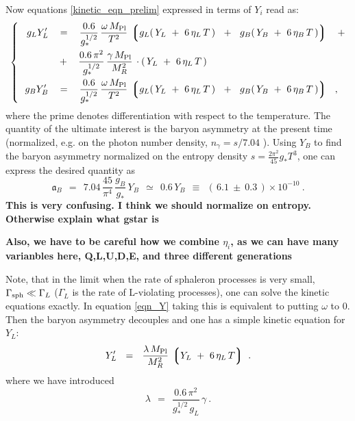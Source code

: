 \documentclass[12pt]{revtex4}
\newcommand{\lgr}{\left\lgroup}
\newcommand{\rgr}{\right\rgroup}
\newcommand{\Mpl}{M_{\rm Pl}}
\newcommand{\Gsph}{\Gamma_{\rm sph}}
\begin{document}
	Now equations \eqref{kinetic_eqn_prelim} expressed in terms of
	$ Y_i $ read as:
\begin{equation}
\label{eqn_Y}
\left\{~~
\begin{split}
	g_L Y_L' 
	& ~~\;=~~\;
	\frac{0.6}{g_*^{1/2}}\, 
	\frac{\omega\,\Mpl}{T^2}\,
	\lgr g_L (\,Y_L~+~6\,\eta_L\,T\,) ~~+~~ 
	     g_B (\,Y_B~+~6\,\eta_B\,T\,)  \rgr 
	\;~~+
	\\
	& \;~~+~~\;  
	\frac{0.6\,\pi^2}{g_*^{1/2}}\, 
	\frac{\gamma\,\Mpl}{M_R^2}\,
	\cdot (\, Y_L ~+~ 6\,\eta_L\,T\,)\\
	g_B Y_B' 
	& ~~\;=~~\;
	\frac{0.6}{g_*^{1/2}}\, 
	\frac{\omega\,\Mpl}{T^2}\,
	\lgr g_L (\,Y_L~+~6\,\eta_L\,T\,) ~~+~~ 
	     g_B (\,Y_B~+~6\,\eta_B\,T\,)  \rgr 
	~~,
\end{split}
\right.
\end{equation}
	where the prime denotes differentiation with respect to
	the temperature.
	The quantity of the ultimate interest is the baryon asymmetry 
	at the present time (normalized, e.g. on the photon number density,
	$ n_\gamma = s / 7.04 $ \cite{Kolb:1990vq}). 
	Using $ Y_B $ to find the baryon asymmetry normalized on the entropy
	density $ s = \frac{2\pi^2}{45} g_* T^3 $, one can express the desired
	quantity as
\begin{equation}
\label{def_asy}
	\mathfrak{a}_B ~~=~~ 7.04\, \frac{45}{\pi^4}\, \frac{g_B}{g_*}\, Y_B
	~~\simeq~~ 0.6 \, Y_B 
		~~\equiv~~ (\, 6.1 ~\pm~ 0.3 \,)\times 10^{-10}~.
\end{equation}
{\bf This is very confusing. I think we should normalize on entropy.
Otherwise explain what gstar is}

{\bf Also, we have to be careful how we combine $\eta_i$, as we can have many varianbles here, 
Q,L,U,D,E, and three different generations} 

	Note, that in the limit when the rate of sphaleron processes
	is very small, $ \Gsph \ll \Gamma_L $ ($ \Gamma_L $ is the rate
	of L-violating processes), one can solve the kinetic equations
	exactly. 
	In equation \eqref{eqn_Y} taking this is equivalent to 
	putting $ \omega $ to $ 0 $.
	Then the baryon asymmetry decouples and one has a simple 
	kinetic equation for $ Y_L $:
\begin{equation}
\label{btz_simple}
	Y_L' ~~=~~ \frac{\lambda\,\Mpl}{M_R^2} \,
			\lgr Y_L ~+~ 6\,\eta_L\, T \rgr~.
\end{equation}
	where we have introduced
\[
	\lambda ~~=~~ \frac{0.6\, \pi^2}
    		         {g_*^{1/2}\, g_L}\,\gamma~.
\]
	
\end{document}
